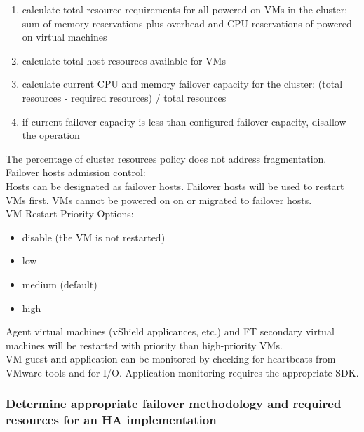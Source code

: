 \begin{enumerate}

\item calculate total resource requirements for all powered-on VMs in the
cluster: sum of memory reservations plus overhead and CPU reservations of
powered-on virtual machines

\item calculate total host resources available for VMs

\item calculate current CPU and memory failover capacity for the cluster:
(total resources - required resources) / total resources

\item if current failover capacity is less than configured failover capacity,
disallow the operation

\end{enumerate}

The percentage of cluster resources policy does not address fragmentation.\\

Failover hosts admission control:\\

Hosts can be designated as failover hosts. Failover hosts will be used to
restart VMs first. VMs cannot be powered on on or migrated to failover hosts.\\

VM Restart Priority Options:

\begin{itemize}
\item disable (the VM is not restarted)
\item low
\item medium (default)
\item high
\end{itemize}

Agent virtual machines (vShield applicances, etc.) and FT secondary virtual
machines will be restarted with priority than high-priority VMs.\\

VM guest and application can be monitored by checking for heartbeats from
VMware tools and for I/O. Application monitoring requires the appropriate SDK.

\subsubsection{Determine appropriate failover methodology and required resources for an HA implementation}
